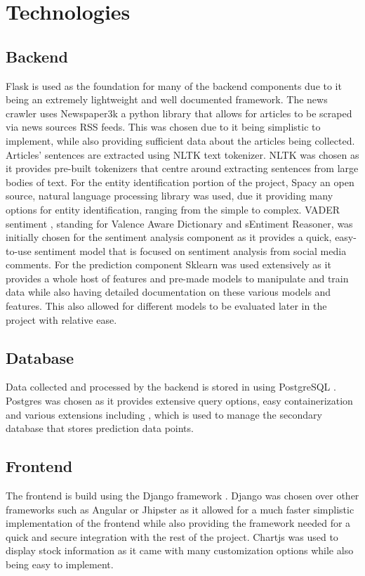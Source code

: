 \section{Technologies}

    \subsection{Backend}
    Flask \citep{technology:Flask} is used as the foundation for many of the backend components due to it being an extremely lightweight and well documented framework. The news crawler uses Newspaper3k \citep{technology:Newspaper} a python library that allows for articles to be scraped via news sources RSS feeds. This was chosen due to it being simplistic to implement, while also providing sufficient data about the articles being collected. Articles’ sentences are extracted using NLTK \citep{Technology:NLTK} text tokenizer. NLTK was chosen as it provides pre-built tokenizers that centre around extracting sentences from large bodies of text. For the entity identification portion of the project, Spacy \citep{technology:Spacy} an open source, natural language processing library was used, due it providing many options for entity identification, ranging from the simple to complex. VADER sentiment \citep{Technology:Vader}, standing for Valence Aware Dictionary and sEntiment Reasoner, was initially chosen for the sentiment analysis component as it provides a quick, easy-to-use sentiment model that is focused on sentiment analysis from social media comments. For the prediction component Sklearn \citep{technology:Scikit-learn} was used extensively as it provides a whole host of features and pre-made models to manipulate and train data while also having detailed documentation on these various models and features. This also allowed for different models to be evaluated later in the project with relative ease. 

    \subsection{Database}
    Data collected and processed by the backend is stored in using PostgreSQL \citep{technology:PostgreSQL}. Postgres was chosen as it provides extensive query options, easy containerization and various extensions including \cite{technology:Timescale}, which is used to manage the secondary database that stores prediction data points. 
    
    \subsection{Frontend}
    The frontend is build using the Django framework \citep{technology:Django}. Django was chosen over other frameworks such as Angular or Jhipster as it allowed for a much faster simplistic implementation of the frontend while also providing the framework needed for a quick and secure integration with the rest of the project. Chartjs \citep{technology:Chartjs} was used to display stock information as it came with many customization options while also being easy to implement. 

